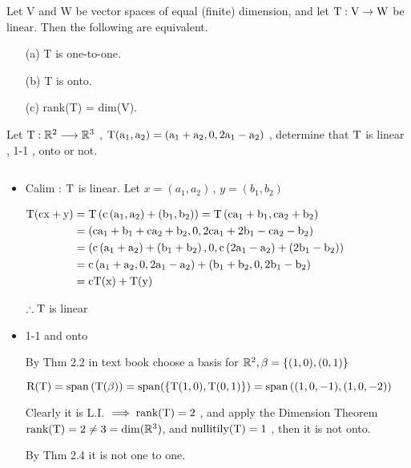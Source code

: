\begin{thm*}[2.5]
$ $ \\	 Let V and W be vector spaces of equal (finite) dimension, and let $\rm T: V  \rightarrow  W$ be linear. Then the following are equivalent.
\begin{enumerate} 
	\item[(a)] T is one-to-one. 
	\item[(b)] T is onto.
	\item[(c)] rank(T) = dim(V).

\end{enumerate}

\end{thm*}

\begin{example}
	Let $\rm T : \mathbb{R}^2\longrightarrow \mathbb{R}^3 $ , $\rm T(a_1,a_2) = (a_1+a_2 , 0 , 2a_1-a_2)$ , determine that $\rm T $ is linear , 1-1 , onto or not.
	\begin{sol*}
		 $ $
		\begin{itemize}
			\item Calim : $\rm T$ is linear.\newline
			Let $ x =(a_1,a_2) \,,\, y= (b_1,b_2)$ 
				
				\(\begin{aligned} \rm T(c x+y) &=\rm T\left(c\left(a_{1}, a_{2}\right)+\left(b_{1}, b_{2}\right)\right)= T\left(ca_{1}+b_{1}, ca_{2}+b_{2}\right) \\ &=\rm \left(c a_{1}+b_{1}+c a_{2}+b_{2}, 0,2 c a_{1}+2 b_{1}-ca_{2}-b_{2}\right) \\ &=\rm \left(c\left(a_{1}+a_{2}\right)+\left(b_{1}+b_{2}\right), 0, c\left(2 a_{1}-a_{2}\right)+\left(2 b_{1}-b_{2}\right)\right) \\ &=\rm c\left(a_{1}+a_{2}, 0,2 a_{1}-a_{2}\right)+\left(b_{1}+b_{2}, 0,2 b_{1}-b_{2}\right) \\ &=\rm c T(x)+T (y) \end{aligned}\)
				
			$\therefore \rm T $ is linear
			\item 1-1 and onto 	
			
			By Thm 2.2 in text book choose a basis for $\mathbb{R}^2 , \beta = \{(1,0) , (0,1)\}$
			
			$\rm R(T) = span\left(T(\beta)\right) = span(\left\{T(1,0) , T(0,1)\right\}) = span\left((1,0,-1), (1,0,-2)\right)$ 
			
			Clearly it is L.I. $\rm\implies rank(T) = 2$ , and apply the Dimension Theorem $\rm rank(T)=2\neq3=\dim(\mathbb{R}^3) $, and $\rm nullitily(T) = 1 $ , then it is not onto.
			
			By Thm 2.4  it is not one to one.
			
		\end{itemize}
	\end{sol*}
		\end{example}
